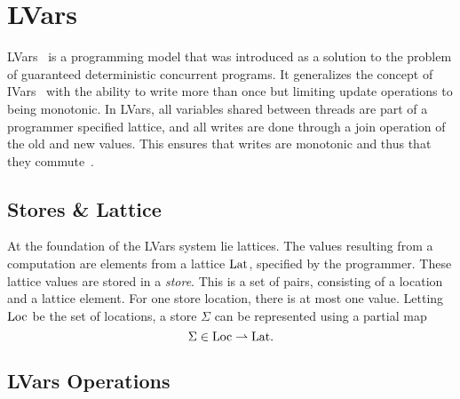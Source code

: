 \section{LVars}\label{sec:lvars}

LVars~\parencite{kuper2013lvars} is a programming model that was introduced as a
solution to the problem of guaranteed deterministic concurrent programs. It
generalizes the concept of IVars~\parencite{nikhil1989structures}
with the ability to write more than once but limiting update operations to being
monotonic.  In LVars, all variables shared between threads are part of a
programmer specified lattice, and all writes are done through a join operation
of the old and new values. This ensures that writes are monotonic and thus that
they commute~\parencite{kuper2013lvars}.

\subsection{Stores \& Lattice}%
\label{sub:stores_and_lattice}

At the foundation of the LVars system lie lattices. The values resulting from a
computation are elements from a lattice $\mathrm{Lat}$, specified by the
programmer. These lattice values are stored in a \emph{store}.  This is a set of
pairs, consisting of a location and a lattice element. For one store location, there is
at most one value. Letting $\mathrm{Loc}$ be the set of locations, a store $\Sigma$ can
be represented using a partial map
\begin{equation*}
  \Sigma \in \mathrm{Loc} \rightharpoonup \mathrm{Lat}.
\end{equation*}

\subsection{LVars Operations}%
\label{sub:lvars_operations}

